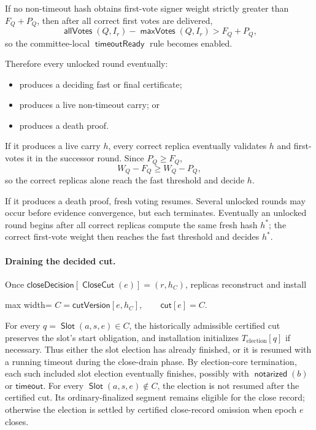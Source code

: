 \documentclass[sigplan,twocolumn,review,anonymous]{acmart}
\newcommand{\func}[1]{\operatorname{\mathsf{#1}}}
\newcommand{\allVotes}{\func{allVotes}}
\newcommand{\maxVotes}{\func{maxVotes}}
\newcommand{\Slot}{\func{Slot}}
\newcommand{\CloseCut}{\func{CloseCut}}
\newcommand{\closeDecision}{\mathsf{closeDecision}}
\newcommand{\timeoutOutcome}{\mathsf{timeout}}
\newcommand{\notarized}{\func{notarized}}
\newcommand{\timeoutReady}{\func{timeoutReady}}
\newcommand{\closeCut}{\mathsf{cut}}
\newcommand{\cutVersion}{\mathsf{cutVersion}}
\begin{document}
If no non-timeout hash obtains first-vote signer weight strictly greater than \(F_Q+P_Q\), then after
all correct first votes are delivered,
\[
\allVotes(Q,I_r)-\maxVotes(Q,I_r)>F_Q+P_Q,
\]
so the committee-local \(\timeoutReady\) rule becomes enabled.

Therefore every unlocked round eventually:
\begin{itemize}
\item produces a deciding fast or final certificate;
\item produces a live non-timeout carry; or
\item produces a death proof.
\end{itemize}

If it produces a live carry \(h\), every correct replica eventually validates \(h\) and first-votes it
in the successor round.  Since \(P_Q\ge F_Q\),
\[
W_Q-F_Q\ge W_Q-P_Q,
\]
so the correct replicas alone reach the fast threshold and decide \(h\).

If it produces a death proof, fresh voting resumes.  Several unlocked rounds may occur before evidence
convergence, but each terminates.  Eventually an unlocked round begins after all correct replicas
compute the same fresh hash \(h^\ast\); the correct first-vote weight then reaches the fast threshold
and decides \(h^\ast\).

\paragraph{Draining the decided cut.}
Once \(\closeDecision[\CloseCut(e)]=(r,h_C)\), replicas reconstruct and install
\begin{center}
\begin{adjustbox}{max width=\columnwidth}
\(\displaystyle
C=\cutVersion[e,h_C],\qquad \closeCut[e]=C.
\)
\end{adjustbox}
\end{center}
For every \(q=\Slot(a,s,e)\in C\), the historically admissible certified cut preserves the slot's start
obligation, and installation initializes \(T_{\mathrm{election}}[q]\) if necessary.  Thus either the slot election has already finished, or it
is resumed with a running timeout during the close-drain phase.  By election-core termination, each
such included slot election eventually
finishes, possibly with \(\notarized(b)\) or \(\timeoutOutcome\).  For every \(\Slot(a,s,e)\notin C\), the election is not resumed after the certified cut.  Its
ordinary-finalized segment remains eligible for the close record; otherwise the election is settled by
certified close-record omission when epoch \(e\) closes.
\end{document}
